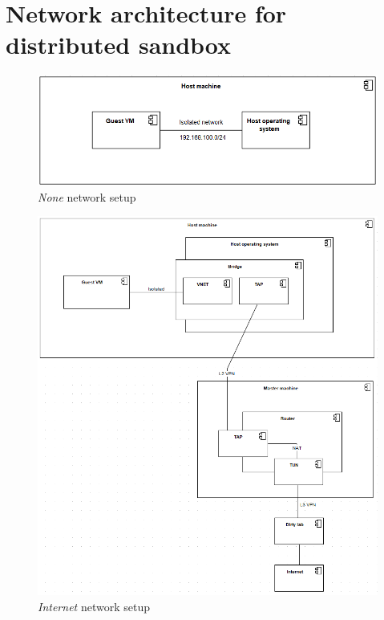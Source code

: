 \chapter{Network architecture for distributed sandbox} \label{app:network}
\begin{figure}[!ht]
    \centering
    \includegraphics[width=\textwidth]{figures/net.png}
    \caption{\emph{None} network setup}
\end{figure}

\begin{figure}
    \centering
    \includegraphics[width=\textwidth]{figures/net2.png}
    \caption{\emph{Internet} network setup}
\end{figure}

